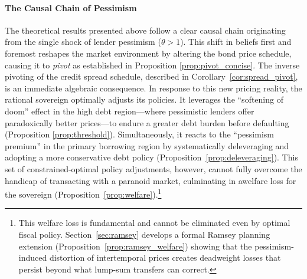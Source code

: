 \documentclass[12pt]{article}
\theoremstyle{plain}
\begin{document}
\paragraph{The Causal Chain of Pessimism}
The theoretical results presented above follow a clear causal chain originating
from the single shock of lender pessimism ($\theta > 1$). This shift in beliefs
first and foremost reshapes the market environment by altering the bond price
schedule, causing it to \textit{pivot} as established in Proposition
\ref{prop:pivot_concise}. The inverse pivoting of the credit spread schedule,
described in Corollary~\ref{cor:spread_pivot}, is an immediate algebraic
consequence. In response to this new pricing reality, the rational sovereign
optimally adjusts its policies. It leverages the ``softening of doom'' effect
in the high debt region—where pessimistic lenders offer paradoxically better
prices—to endure a greater debt burden before defaulting (Proposition
\ref{prop:threshold}). Simultaneously, it reacts to the ``pessimism premium''
in the primary borrowing region by systematically deleveraging and adopting a
more conservative debt policy (Proposition~\ref{prop:deleveraging}). This set
of constrained-optimal policy adjustments, however, cannot fully overcome the
handicap of transacting with a paranoid market, culminating in awelfare loss
for the sovereign (Proposition~\ref{prop:welfare}).\footnote{This welfare loss
	is fundamental and cannot be eliminated even by optimal fiscal policy.
	Section~\ref{sec:ramsey} develops a formal Ramsey planning extension
	(Proposition~\ref{prop:ramsey_welfare}) showing that the pessimism-induced
	distortion of intertemporal prices creates deadweight losses that persist
	beyond what lump-sum transfers can correct.}
\end{document}
